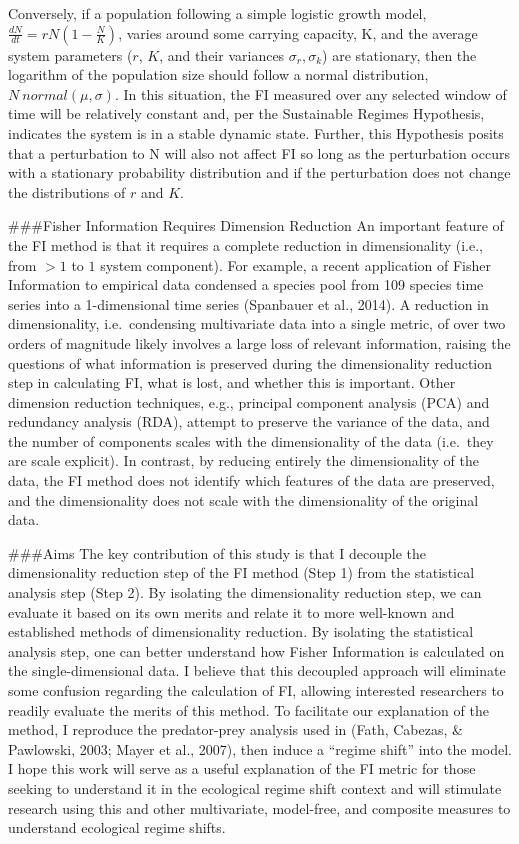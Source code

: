 \documentclass[12pt,twoside,openany]{reedthesis}
\begin{document}
Conversely, if a population following a simple logistic growth model, \(\frac{dN}{dt}=rN(1-\frac{N}{K})\), varies around some carrying capacity, K, and the average system parameters (\(r\), \(K\), and their variances \(\sigma_r, \sigma_k\)) are stationary, then the logarithm of the population size should follow a normal distribution, \(N ~ normal(\mu,\sigma)\). In this situation, the FI measured over any selected window of time will be relatively constant and, per the Sustainable Regimes Hypothesis, indicates the system is in a stable dynamic state. Further, this Hypothesis posits that a perturbation to N will also not affect FI so long as the perturbation occurs with a stationary probability distribution and if the perturbation does not change the distributions of \(r\) and \(K\).

\#\#\#Fisher Information Requires Dimension Reduction
An important feature of the FI method is that it requires a complete reduction in dimensionality (i.e., from \(>1\) to \(1\) system component). For example, a recent application of Fisher Information to empirical data condensed a species pool from 109 species time series into a 1-dimensional time series (Spanbauer et al., 2014). A reduction in dimensionality, i.e.~condensing multivariate data into a single metric, of over two orders of magnitude likely involves a large loss of relevant information, raising the questions of what information is preserved during the dimensionality reduction step in calculating FI, what is lost, and whether this is important. Other dimension reduction techniques, e.g., principal component analysis (PCA) and redundancy analysis (RDA), attempt to preserve the variance of the data, and the number of components scales with the dimensionality of the data (i.e.~they are scale explicit). In contrast, by reducing entirely the dimensionality of the data, the FI method does not identify which features of the data are preserved, and the dimensionality does not scale with the dimensionality of the original data.

\#\#\#Aims
The key contribution of this study is that I decouple the dimensionality reduction step of the FI method (Step 1) from the statistical analysis step (Step 2). By isolating the dimensionality reduction step, we can evaluate it based on its own merits and relate it to more well-known and established methods of dimensionality reduction. By isolating the statistical analysis step, one can better understand how Fisher Information is calculated on the single-dimensional data. I believe that this decoupled approach will eliminate some confusion regarding the calculation of FI, allowing interested researchers to readily evaluate the merits of this method. To facilitate our explanation of the method, I reproduce the predator-prey analysis used in (Fath, Cabezas, \& Pawlowski, 2003; Mayer et al., 2007), then induce a ``regime shift'' into the model. I hope this work will serve as a useful explanation of the FI metric for those seeking to understand it in the ecological regime shift context and will stimulate research using this and other multivariate, model-free, and composite measures to understand ecological regime shifts.
\end{document}
